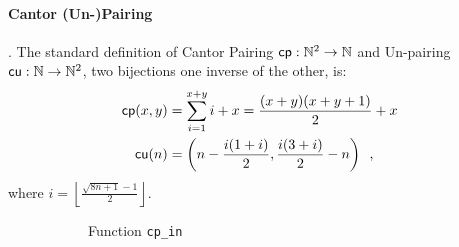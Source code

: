 \documentclass[runningheads]{llncs}
\begin{document}
\paragraph{Cantor (Un-)Pairing}. The standard definition of Cantor Pairing $\mathsf{cp} : \mathbb{N}^2 \to \mathbb{N}$ and Un-pairing $\mathsf{cu} : \mathbb{N} \to \mathbb{N}^2$, two bijections one inverse of the other, is:
\begin{align}
\label{align: cp analitically}
\mathsf{cp}(x,y) & = \sum_{i=1}^{x+y}i + x = \frac{(x + y)(x + y + 1)}{2} + x
\\
\label{align: cu analitically}
\mathsf{cu}(n)  & = \left( n - \frac{i(1+i)}{2}, \frac{i(3+i)}{2} - n \right)
\enspace ,
\end{align}
where $i = \left\lfloor \frac{\sqrt{8n + 1} - 1}{2} \right\rfloor $.

\begin{figure}
\begin{subfigure}{.975\textwidth}
    \centering
{}
    \caption{Function \lstinline|cp_in|}
    \label{sfig:cp input}
\end{subfigure}
\\
\begin{subfigure}{.975\textwidth}
\centering
{}
\end{subfigure}
\end{figure}
\end{document}
